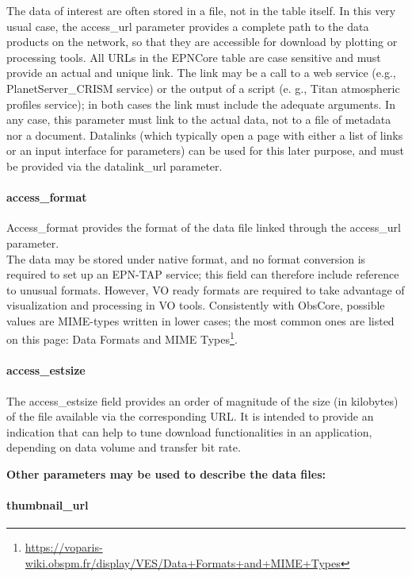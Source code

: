 \documentclass[11pt,a4paper]{ivoa}
\begin{document}
The data of interest are often stored in a file, not in the table itself. In this very usual case, the access\_url parameter provides a complete path to the data products on the network, so that they are accessible for download by plotting or processing tools. All URLs in the EPNCore table are case sensitive and must provide an actual and unique link. The link may be a call to a web service (e.g., PlanetServer\_CRISM service) or the output of a script (e. g., Titan atmospheric profiles service); in both cases the link must include the adequate arguments. In any case, this parameter must link to the actual data, not to a file of metadata nor a document. Datalinks (which typically open a page with either a list of links or an input interface for parameters) can be used for this later purpose, and must be provided via the datalink\_url parameter. 

\paragraph{access\_format}

Access\_format provides the format of the data file linked through the access\_url parameter. \\The data may be stored under native format, and no format conversion is required to set up an EPN-TAP service; this field can therefore include reference to unusual formats. However, VO ready formats are required to take advantage of visualization and processing in VO tools. Consistently with ObsCore, possible values are MIME-types written in lower cases; the most common ones are listed on this page: Data Formats and MIME Types\footnote{\url{https://voparis-wiki.obspm.fr/display/VES/Data+Formats+and+MIME+Types}}.

\paragraph{access\_estsize}

The access\_estsize field provides an order of magnitude of the size (in kilobytes) of the file available via the corresponding URL. It is intended to provide an indication that can help to tune download functionalities in an application, depending on data volume and transfer bit rate.


\textbf{Other parameters may be used to describe the data files:}

\paragraph{thumbnail\_url}
\end{document}
